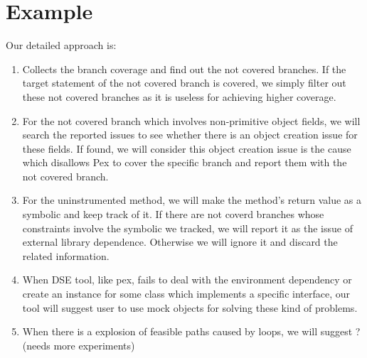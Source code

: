 \section{Example}







Our detailed approach is:
\begin{enumerate}
\item Collects the branch coverage and find out the not covered branches. If the target statement of the not covered branch is covered, we simply filter out these not covered branches as it is useless for achieving higher coverage.
\item For the not covered branch which involves non-primitive object fields, we will search the reported issues to see whether there is an object creation issue for these fields. If found, we will consider this object creation issue is the cause which disallows Pex to cover the specific branch and report them with the not covered branch. 
\item For the uninstrumented method, we will make the method's return value as a symbolic and keep track of it. If there are not coverd branches whose constraints involve the symbolic we tracked, we will report it as the issue of external library dependence. Otherwise we will ignore it and discard the related information.
\item When DSE tool, like pex, fails to deal with the environment dependency or create an instance for some class which implements a specific interface, our tool will suggest user to use mock objects for solving these kind of problems.
\item When there is a explosion of feasible paths caused by loops, we will suggest ? (needs more experiments)
\end{enumerate}